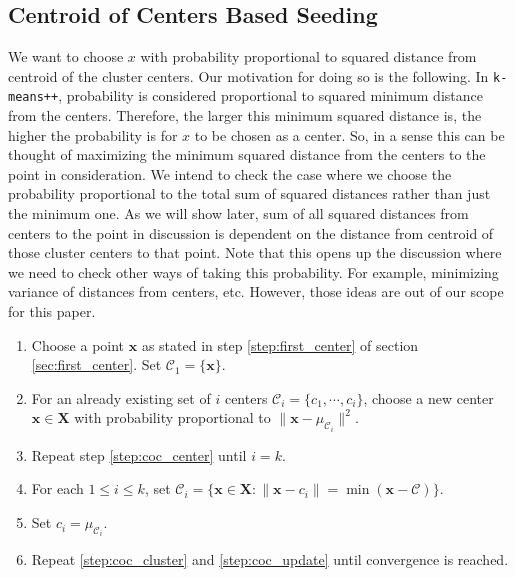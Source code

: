 \documentclass[twoside, 11pt]{article}
\newcommand{\x}{\mathbf{x}}
\newcommand{\X}{\mathbf{X}}
\newcommand{\C}{\mathcal{C}}
\begin{document}
	\subsection{Centroid of Centers Based Seeding}
	We want to choose $x$ with probability proportional to squared distance from centroid of the cluster centers. Our motivation for doing so is the following. In \texttt{k-means++}, probability is considered proportional to squared minimum distance from the centers. Therefore, the larger this minimum squared distance is, the higher the probability is for $x$ to be chosen as a center. So, in a sense this can be thought of maximizing the minimum squared distance from the centers to the point in consideration. We intend to check the case where we choose the probability proportional to the total sum of squared distances rather than just the minimum one. As we will show later, sum of all squared distances from centers to the point in discussion is dependent on the distance from centroid of those cluster centers to that point. Note that this opens up the discussion where we need to check other ways of taking this probability. For example, minimizing variance of distances from centers, etc. However, those ideas are out of our scope for this paper.
		\begin{enumerate}[i]
			\item Choose a point $\x$ as stated in step \eqref{step:first_center} of section \eqref{sec:first_center}. Set $\C_1=\{\x\}$.
			\item For an already existing set of $i$ centers $\mathcal{C}_i=\{c_1,\cdots,c_i\}$, choose a new center $\x\in\X$ with probability proportional to $\|\x-\mu_{\C_i}\|^2$.\label{step:coc_center}
			\item Repeat step \eqref{step:coc_center} until $i=k$.
			\item For each $1\leq i\leq k$, set $\C_i=\{\x\in\X:\|\x-c_i\|=\min(\x-\C)\}$.\label{step:coc_cluster}
			\item Set $c_i=\mu_{\C_i}$.\label{step:coc_update}
			\item Repeat \eqref{step:coc_cluster} and \eqref{step:coc_update} until convergence is reached.
		\end{enumerate}
\end{document}

